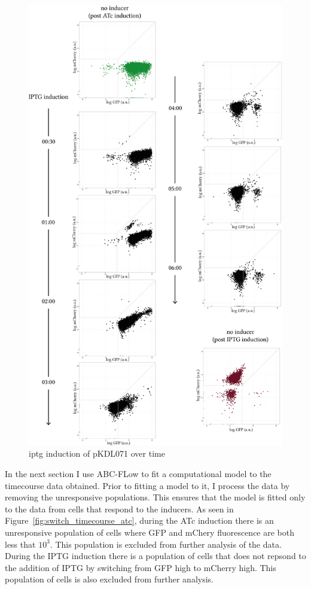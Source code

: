 \begin{figure}[tb]
	\begin{center}
\includegraphics[scale=0.7]{../../chapters/chapterABCFlow/images/pKDL071_iptg_time.png}
\caption[LoF caption]{\label{fig:switch_timecourse_iptg} \acrshort{iptg} induction of pKDL071 over time}
\end{center}
\end{figure}
\clearpage

In the next section I use ABC-FLow to fit a computational model to the timecourse data obtained. Prior to fitting a model to it, I process the data by removing the unresponsive populations. This ensures that the model is fitted only to the data from cells that respond to the inducers. As seen in Figure~\ref{fig:switch_timecourse_atc}, during the ATc induction there is an unresponsive population of cells where GFP and mChery fluorescence are both less that $10^3$. This population is excluded from further analysis of the data. During the IPTG induction there is a population of cells that does not repsond to the addition of IPTG by switching from GFP high to mCherry high. This population of cells is also excluded from further analysis. 

